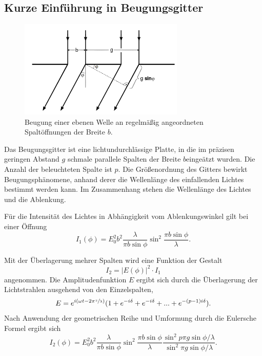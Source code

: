 \subsection{Kurze Einführung in Beugungsgitter}
\begin{figure}
	\centering
	\includegraphics[width=0.7\textwidth]{Bilder/Gitter.png}
	\caption{Beugung einer ebenen Welle an regelmäßig angeordneten Spaltöffnungen der Breite $b$. \cite{skript}} 
\end{figure}
Das Beugungsgitter ist eine lichtundurchlässige Platte, in die im präzisen geringen Abstand $g$ schmale parallele Spalten der Breite $b$eingeätzt wurden.
Die Anzahl der beleuchteten Spalte ist $p$.
Die Größenordnung des Gitters bewirkt Beugungsphänomene, anhand derer die Wellenlänge des einfallenden Lichtes bestimmt werden kann.
Im Zusammenhang stehen die Wellenlänge des Lichtes und die Ablenkung.

Für die Intensität des Lichtes in Abhängigkeit vom Ablenkungswinkel gilt bei einer Öffnung
\begin{equation}
	I_1(\phi)=E_0^2b^2\frac{\lambda}{\pi b\sin{\phi}}\sin^2{\frac{\pi b\sin{\phi}}{\lambda}}.
\end{equation}

Mit der Überlagerung mehrer Spalten wird eine Funktion der Gestalt
\begin{equation}
	I_2=|E(\phi)|^2\cdot I_1
\end{equation}
angenommen.
Die Amplitudenfunktion $E$ ergibt sich durch die Überlagerung der Lichtstrahlen ausgehend von den Einzelspalten,
\begin{equation}
	E=e^{i(\omega t-2\pi \sfrac{z}{\lambda})}(1+e^{-i\delta}+e^{-i\delta}+...+e^{-(p-1)i\delta}).
\end{equation}
Nach Anwendung der geometrischen Reihe und Umformung durch die Eulersche Formel ergibt sich
\begin{equation}
	I_2(\phi)=E_0^2b^2
	\frac{\lambda}{\pi b\sin{\phi}}
	\sin^2{\frac{\pi b\sin{\phi}}{\lambda}}
	\frac{\sin^2{p\pi g\sin{\phi}/\lambda}}
	{\sin^2{\pi g\sin{\phi}/\lambda}}.
\end{equation}

